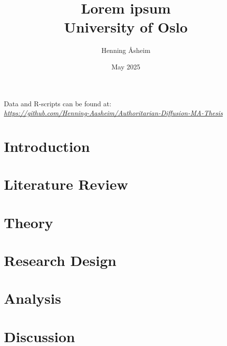 \documentclass[12pt]{report} %
\title{{Lorem ipsum}\\
       {\large University of Oslo}
}
\author{Henning Åsheim}
\date{May 2025}
\begin{document}
\maketitle


\newpage
\thispagestyle{empty}
\vspace*{\fill}
\begin{center}
    Data and R-scripts can be found at: \\
    \href{https://github.com/Henning-Aasheim/Authoritarian-Diffusion-MA-Thesis}{\textit{https://github.com/Henning-Aasheim/Authoritarian-Diffusion-MA-Thesis}}
\end{center}
\vspace*{\fill}

\newpage

\tableofcontents

\listoffigures

\listoftables

\chapter{Introduction} \label{chp:introduction}


\chapter{Literature Review} \label{chp:literature}


\chapter{Theory} \label{chp:theory}


\chapter{Research Design} \label{chp:research_design}


\chapter{Analysis} \label{chp:analysis}


\chapter{Discussion}
 \label{chp:discussion}
\end{document}
